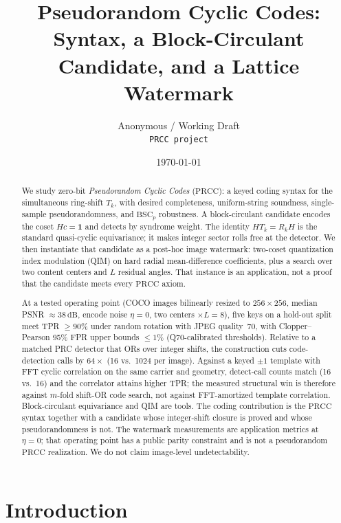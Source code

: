\documentclass[11pt,a4paper]{article}
\title{Pseudorandom Cyclic Codes:\\
Syntax, a Block-Circulant Candidate, and a Lattice Watermark}
\author{
Anonymous / Working Draft\\
\texttt{PRCC project}
}
\date{\today}
\newcommand{\BSC}{\mathrm{BSC}}
\newcommand{\PRCC}{\ensuremath{\mathrm{PRCC}}}
\begin{document}
\maketitle

\begin{abstract}
We study zero-bit \emph{Pseudorandom Cyclic Codes} (\PRCC{}): a keyed coding syntax
for the simultaneous ring-shift \(T_k\), with desired completeness, uniform-string
soundness, single-sample pseudorandomness, and \(\BSC_p\) robustness.
A block-circulant candidate encodes the coset \(Hc=\mathbf{1}\) and detects by
syndrome weight.
The identity \(HT_k=R_kH\) is the standard quasi-cyclic equivariance; it makes
integer sector rolls free at the detector.
We then instantiate that candidate as a post-hoc image watermark: two-coset
quantization index modulation (QIM) on hard radial mean-difference coefficients,
plus a search over two content centers and \(L\) residual angles.
That instance is an application, not a proof that the candidate meets every
\PRCC{} axiom.

At a tested operating point (COCO images bilinearly resized to \(256\times256\),
median PSNR \(\approx 38\,\mathrm{dB}\), encode noise \(\eta=0\), two centers
\(\times L=8\)), five keys on a hold-out split meet TPR \(\ge 90\%\) under random
rotation with JPEG quality~70, with Clopper--Pearson 95\% FPR upper bounds
\(\le 1\%\) (Q70-calibrated thresholds).
Relative to a matched PRC detector that ORs over integer shifts, the construction
cuts code-detection calls by \(64\times\) (16 vs.\ 1024 per image).
Against a keyed \(\pm 1\) template with FFT cyclic correlation on the same carrier and
geometry, detect-call counts match (16 vs.\ 16) and the correlator attains higher TPR;
the measured structural win is therefore against \(m\)-fold shift-OR code search, not
against FFT-amortized template correlation.
Block-circulant equivariance and QIM are tools.
The coding contribution is the \PRCC{} syntax together with a candidate whose
integer-shift closure is proved and whose pseudorandomness is not.
The watermark measurements are application metrics at \(\eta=0\); that operating
point has a public parity constraint and is not a pseudorandom \PRCC{} realization.
We do not claim image-level undetectability.
\end{abstract}

\section{Introduction}
\label{sec:intro}
\end{document}
